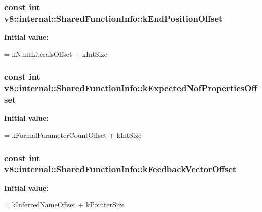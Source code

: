 \subsubsection[{k\+End\+Position\+Offset}]{\setlength{\rightskip}{0pt plus 5cm}const int v8\+::internal\+::\+Shared\+Function\+Info\+::k\+End\+Position\+Offset\hspace{0.3cm}{\ttfamily [static]}}\label{classv8_1_1internal_1_1_shared_function_info_a72e034f92ee4560197968f5b89fa6672}
{\bfseries Initial value\+:}
\begin{DoxyCode}
=
      kNumLiteralsOffset + kIntSize
\end{DoxyCode}
\hypertarget{classv8_1_1internal_1_1_shared_function_info_a4dc0c89088034e5de4879150eea07fb2}{}
\subsubsection[{k\+Expected\+Nof\+Properties\+Offset}]{\setlength{\rightskip}{0pt plus 5cm}const int v8\+::internal\+::\+Shared\+Function\+Info\+::k\+Expected\+Nof\+Properties\+Offset\hspace{0.3cm}{\ttfamily [static]}}\label{classv8_1_1internal_1_1_shared_function_info_a4dc0c89088034e5de4879150eea07fb2}
{\bfseries Initial value\+:}
\begin{DoxyCode}
=
      kFormalParameterCountOffset + kIntSize
\end{DoxyCode}
\hypertarget{classv8_1_1internal_1_1_shared_function_info_a4782b957fff7740b6b585b22bca50d55}{}
\subsubsection[{k\+Feedback\+Vector\+Offset}]{\setlength{\rightskip}{0pt plus 5cm}const int v8\+::internal\+::\+Shared\+Function\+Info\+::k\+Feedback\+Vector\+Offset\hspace{0.3cm}{\ttfamily [static]}}\label{classv8_1_1internal_1_1_shared_function_info_a4782b957fff7740b6b585b22bca50d55}
{\bfseries Initial value\+:}
\begin{DoxyCode}
=
      kInferredNameOffset + kPointerSize
\end{DoxyCode}
\hypertarget{classv8_1_1internal_1_1_shared_function_info_a37ac8977c943f1a1a385267bfdd6ea12}{}
